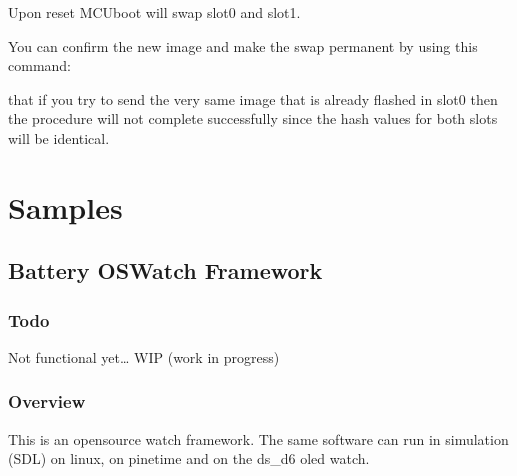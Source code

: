\documentclass[letterpaper,10pt,english]{sphinxmanual}
\begin{document}
\begin{sphinxVerbatim}[commandchars=\\\{\}]
\end{sphinxVerbatim}

Upon reset MCUboot will swap slot\sphinxhyphen{}0 and slot\sphinxhyphen{}1.

You can confirm the new image and make the swap permanent by using this command:

\begin{sphinxVerbatim}[commandchars=\\\{\}]
\end{sphinxVerbatim}

 that if you try to send the very same image that is already flashed in
slot\sphinxhyphen{}0 then the procedure will not complete successfully since the hash values
for both slots will be identical.
\begin{quote}
\end{quote}


\chapter{Samples}
\label{\detokenize{samples/index:samples}}\label{\detokenize{samples/index:id1}}\label{\detokenize{samples/index::doc}}

\section{Battery OSWatch Framework}
\label{\detokenize{samples/oswatch-batteryREADME:battery-oswatch-framework}}\label{\detokenize{samples/oswatch-batteryREADME:oswatch}}\label{\detokenize{samples/oswatch-batteryREADME::doc}}

\subsection{Todo}
\label{\detokenize{samples/oswatch-batteryREADME:todo}}
Not functional yet…
WIP (work in progress)


\subsection{Overview}
\label{\detokenize{samples/oswatch-batteryREADME:overview}}
This is an opensource watch framework.
The same software can run in simulation (SDL) on linux, on pinetime and on the ds\_d6 oled watch.
\end{document}
